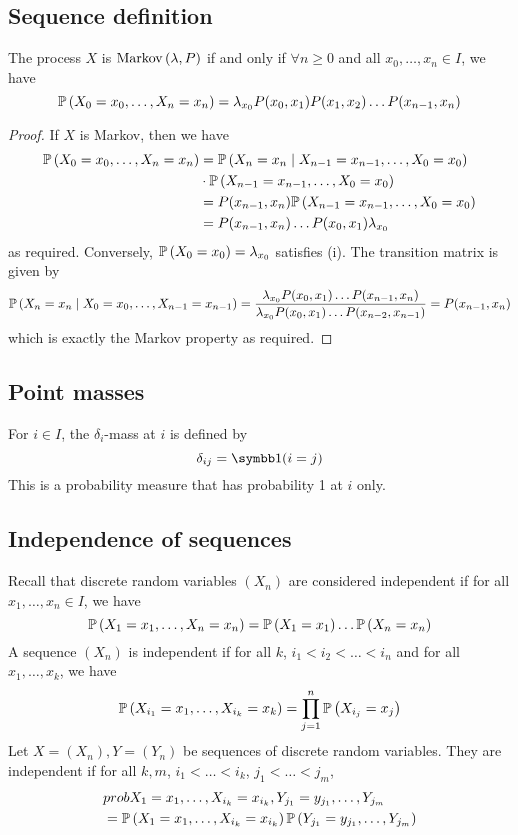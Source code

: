 \subsection{Sequence definition}
\begin{theorem}
	The process \( X \) is \( \operatorname{Markov}\left({\lambda, P}\right) \) if and only if \( \forall n \geq 0 \) and all \( x_0, \dots, x_n \in I \), we have
	\[
		\mathbb{P}\left({X_0 = x_0, \dots, X_n = x_n}\right) = \lambda_{x_0} P(x_0, x_1) P(x_1, x_2) \dots P(x_{n-1}, x_n)
	\]
\end{theorem}
\begin{proof}
	If \( X \) is Markov, then we have
	\begin{align*}
		\mathbb{P}\left({X_0 = x_0, \dots, X_n = x_n}\right) & = \mathbb{P}\left({X_n = x_n \mid X_{n-1} = x_{n-1}, \dots, X_0 = x_0}\right)  \\
		                                   & \cdot \mathbb{P}\left({X_{n-1} = x_{n-1}, \dots, X_0 = x_0}\right)             \\
		                                   & = P(x_{n-1}, x_n) \mathbb{P}\left({X_{n-1} = x_{n-1}, \dots, X_0 = x_0}\right) \\
		                                   & = P(x_{n-1}, x_n) \dots P(x_0, x_1) \lambda_{x_0}
	\end{align*}
	as required.
	Conversely, \( \mathbb{P}\left({X_0 = x_0}\right) = \lambda_{x_0} \) satisfies (i).
	The transition matrix is given by
	\[
		\mathbb{P}\left({X_n = x_n \mid X_0 = x_0, \dots, X_{n-1} = x_{n-1}}\right) = \frac{\lambda_{x_0} P(x_0, x_1) \dots P(x_{n-1}, x_n)}{\lambda_{x_0} P(x_0, x_1) \dots P(x_{n-2}, x_{n-1})} = P(x_{n-1}, x_n)
	\]
	which is exactly the Markov property as required.
\end{proof}

\subsection{Point masses}
\begin{definition}
	For \( i \in I \), the \( \delta_i \)-mass at \( i \) is defined by
	\[
		\delta_{ij} = \symbb 1 (i = j)
	\]
	This is a probability measure that has probability 1 at \( i \) only.
\end{definition}

\subsection{Independence of sequences}
Recall that discrete random variables \( (X_n) \) are considered independent if for all \( x_1, \dots, x_n \in I \), we have
\[
	\mathbb{P}\left({X_1 = x_1, \dots, X_n = x_n}\right) = \mathbb{P}\left({X_1 = x_1}\right)\dots\mathbb{P}\left({X_n = x_n}\right)
\]
A sequence \( (X_n) \) is independent if for all \( k \), \( i_1 < i_2 < \dots < i_n \) and for all \( x_1, \dots, x_k \), we have
\[
	\mathbb{P}\left({X_{i_1} = x_1, \dots, X_{i_k} = x_k}\right) = \prod_{j=1}^n \mathbb{P}\left({X_{i_j} = x_j}\right)
\]
Let \( X = (X_n), Y = (Y_n) \) be sequences of discrete random variables.
They are independent if for all \(k,m\), \( i_1 < \dots < i_k \), \( j_1 < \dots < j_m \),
\begin{align*}
	&prob{X_1 = x_1, \dots, X_{i_k} = x_{i_k}, Y_{j_1} = y_{j_1}, \dots, Y_{j_m}} \\
	&= \mathbb{P}\left({X_1 = x_1, \dots, X_{i_k} = x_{i_k}}\right) \mathbb{P}\left({Y_{j_1} = y_{j_1}, \dots, Y_{j_m}}\right)
\end{align*}

